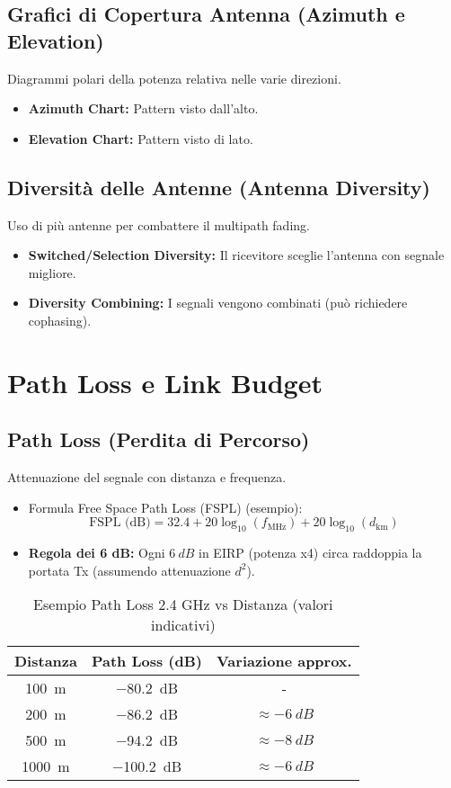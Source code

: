 \documentclass{article}
\begin{document}
\subsection{Grafici di Copertura Antenna (Azimuth e Elevation)}
Diagrammi polari della potenza relativa nelle varie direzioni.
\begin{itemize}
    \item \textbf{Azimuth Chart:} Pattern visto dall'alto.
    \item \textbf{Elevation Chart:} Pattern visto di lato.
\end{itemize}

\subsection{Diversità delle Antenne (Antenna Diversity)}
Uso di più antenne per combattere il multipath fading.
\begin{itemize}
    \item \textbf{Switched/Selection Diversity:} Il ricevitore sceglie l'antenna con segnale migliore.
    \item \textbf{Diversity Combining:} I segnali vengono combinati (può richiedere cophasing).
\end{itemize}

\section{Path Loss e Link Budget}

\subsection{Path Loss (Perdita di Percorso)}
Attenuazione del segnale con distanza e frequenza.
\begin{itemize}
    \item Formula Free Space Path Loss (FSPL) (esempio):
    \[ \text{FSPL (dB)} = 32.4 + 20 \log_{10}(f_{\text{MHz}}) + 20 \log_{10}(d_{\text{km}}) \]
    \item \textbf{Regola dei 6 dB:} Ogni $\SI{+6}{dB}$ in EIRP (potenza x4) circa raddoppia la portata Tx (assumendo attenuazione $d^2$).
\end{itemize}
\begin{table}[H]
\centering
\caption{Esempio Path Loss 2.4 GHz vs Distanza (valori indicativi)}
\begin{tabular}{|c|c|c|}
\hline
\textbf{Distanza} & \textbf{Path Loss (dB)} & \textbf{Variazione approx.} \\ \hline
\SI{100}{\meter} & \SI{-80.2}{dB} & - \\ \hline
\SI{200}{\meter} & \SI{-86.2}{dB} & $\approx \SI{-6}{dB}$ \\ \hline
\SI{500}{\meter} & \SI{-94.2}{dB} & $\approx \SI{-8}{dB}$ \\ \hline
\SI{1000}{\meter} & \SI{-100.2}{dB} & $\approx \SI{-6}{dB}$ \\ \hline
\end{tabular}
\label{tab:path_loss}
\end{table}
\end{document}
